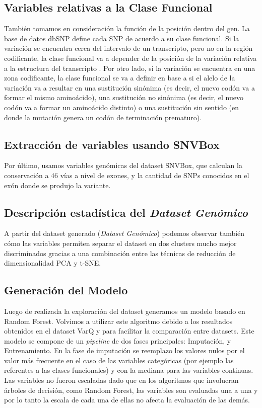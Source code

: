 \subsection{Variables relativas a la Clase Funcional}

También tomamos en consideración la función de la posición dentro del gen. La base de datos dbSNP define cada SNP de acuerdo a su clase funcional. Si la variación se encuentra cerca del intervalo de un transcripto, pero no en la región codificante, la clase funcional va a depender de la posición de la variación relativa a la estructura del transcripto \cite{Ostell2007}. Por otro lado, si la variación se encuentra en una zona codificante, la clase funcional se va a definir en base a si el alelo de la variación va a resultar en una sustitución sinónima (es decir, el nuevo codón va a formar el mismo aminoácido), una sustitución no sinónima (es decir, el nuevo codón va a formar un aminoácido distinto) o una sustitución sin sentido (en donde la mutación genera un codón de terminación prematuro).

\subsection{Extracción de variables usando SNVBox}

Por último, usamos variables genómicas del dataset SNVBox, que calculan la conservación a 46 vías a nivel de exones, y la cantidad de SNPs conocidos en el exón donde se produjo la variante. 

\subsection{Descripción estadística del \textit{Dataset Genómico}}

A partir del dataset generado (\textit{Dataset Genómico}) podemos observar también cómo las variables permiten separar el dataset en dos clusters mucho mejor discriminados gracias a una combinación entre las técnicas de reducción de dimensionalidad PCA y t-SNE.



\subsection{Generación del Modelo}

Luego de realizada la exploración del dataset generamos un modelo basado en Random Forest. Volvimos a utilizar este algoritmo debido a los resultados obtenidos en el dataset VarQ y para facilitar la comparación entre datasets. Este modelo se compone de un \textit{pipeline} de dos fases principales: Imputación, y Entrenamiento. En la fase de imputación se reemplazo los valores nulos por el valor más frecuente en el caso de las variables categóricas (por ejemplo las referentes a las clases funcionales) y con la mediana para las variables continuas. Las variables no fueron escaladas dado que en los algoritmos que involucran árboles de decisión, como Random Forest, las variables son evaluadas una a una y por lo tanto la escala de cada una de ellas no afecta la evaluación de las demás.

